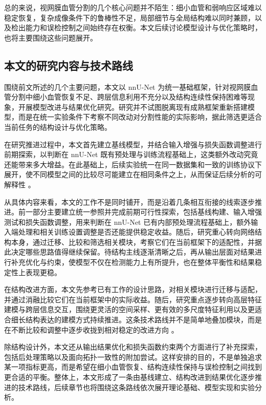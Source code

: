 \documentclass[a4paper,12pt]{article}
\begin{document}
总的来说，视网膜血管分割的几个核心问题并不陌生：细小血管和弱响应区域难以稳定恢复，复杂成像条件下的鲁棒性不足，局部细节与全局结构难以同时兼顾，以及检出能力和误检控制之间始终存在权衡。本文后续讨论模型设计与优化策略时，也将主要围绕这些问题展开。

\subsection{本文的研究内容与技术路线}
围绕前文所述的几个主要问题，本文以 nnU-Net 为统一基础框架，针对视网膜血管分割中细小血管恢复不足、跨层信息利用不充分以及结构连续性保持困难等现象，开展模型改进与结果优化研究。研究并不试图脱离现有成熟框架重新搭建模型，而是在统一实验条件下考察不同改动对分割性能的实际影响，据此筛选更适合当前任务的结构设计与优化策略。

在研究推进过程中，本文首先建立基线模型，并结合输入增强与损失函数调整进行前期探索，以判断在 nnU-Net 既有预处理与训练流程基础上，这类额外改动究竟还能带来多大增益。在此基础上，后续实验统一在同一数据集和一致的训练协议下展开，使不同模型之间的比较尽可能建立在相同条件之上，从而保证后续分析的可解释性 \cite{isensee2021nnunet}。

从具体内容来看，本文的工作不是同时铺开，而是沿着几条相互衔接的线索逐步推进。前一部分主要建立统一参照并完成前期可行性探索，包括基线构建、输入增强测试和损失函数调整，用来判断在 nnU-Net 已有内部预处理流程基础上，额外输入端处理和相关训练设置调整是否还能提供稳定收益。随后，研究重心转向网络结构本身，通过迁移、比较和筛选相关模块，考察它们在当前框架下的适配性，并据此决定哪些思路值得继续保留。待结构主线逐渐清晰之后，再从输出层面对结果进行补充优化与约束，使模型不仅在检测能力上有所提升，也在整体平衡性和结果稳定性上表现更稳。

在结构改进方面，本文先参考已有工作的设计思路，对相关模块进行迁移与适配，并通过消融比较它们在当前框架中的实际收益。随后，研究重点逐步转向高层特征建模与跨层信息交互，围绕更灵活的空间采样、更有效的多尺度特征利用以及更适合细长结构表达的建模方式持续推进。这条技术路线并不是简单地叠加模块，而是在不断比较和调整中逐步收拢到相对稳定的改进方向 \cite{luo2025panet,zhu2021deformabledetr,zhu2019dcnv2,hou2021coordatt,qi2023dsc}。

除结构设计外，本文还从输出结果优化和损失函数约束两个方面进行了补充探索，包括后处理策略以及面向拓扑一致性的附加尝试。这样安排的目的，不是单独追求某一项指标更高，而是希望在细小血管恢复、结构连续性保持与误检控制之间找到更合适的平衡。整体上，本文形成了一条由基线建立、结构改进到结果优化逐步推进的技术路线，后续章节也将围绕这条路线依次展开理论基础、模型实现和实验分析。
\end{document}
